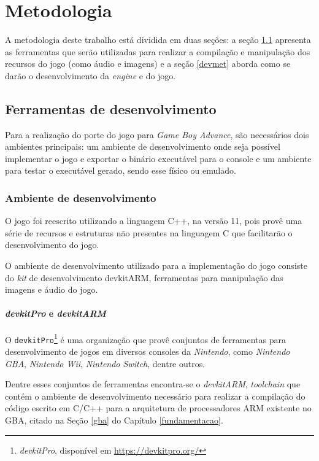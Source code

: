\chapter[Metodologia]{Metodologia} \label{metodologia}

A metodologia deste trabalho está dividida em duas seções: a seção \ref{devtools} apresenta as ferramentas que serão utilizadas para realizar a compilação e manipulação dos recursos do jogo (como áudio e imagens) e a seção \ref{devmet} aborda como se darão o desenvolvimento da \textit{engine} e do jogo.

\section{Ferramentas de desenvolvimento} \label{devtools}

  Para a realização do porte do jogo para \textit{Game Boy Advance}, são necessários dois ambientes principais: um ambiente de desenvolvimento onde seja possível implementar o jogo e exportar o binário executável para o console e um ambiente para testar o executável gerado, sendo esse físico ou emulado.

  \subsection{Ambiente de desenvolvimento}

    O jogo foi reescrito utilizando a linguagem C++, na versão 11, pois provê uma série de recursos e estruturas não presentes na linguagem C que facilitarão o desenvolvimento do jogo.

    O ambiente de desenvolvimento utilizado para a implementação do jogo consiste do \textit{kit} de desenvolvimento devkitARM, ferramentas para manipulação das imagens e áudio do jogo.

    \subsubsection{\textit{devkitPro} e \textit{devkitARM}}

      O \texttt{devkitPro}\footnote{\textit{devkitPro}, disponível em \url{https://devkitpro.org/}} é uma organização que provê conjuntos de ferramentas para desenvolvimento de jogos em diversos consoles da \textit{Nintendo}, como \textit{Nintendo GBA}, \textit{Nintendo Wii}, \textit{Nintendo Switch}, dentre outros.

      Dentre esses conjuntos de ferramentas encontra-se o \textit{devkitARM}, \textit{toolchain} que contém o ambiente de desenvolvimento necessário para realizar a compilação do código escrito em C/C++ para a arquitetura de processadores ARM existente no GBA, citado na Seção \ref{gba} do Capítulo \ref{fundamentacao}.

